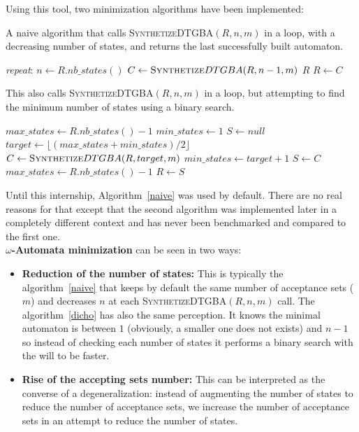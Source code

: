 \noindent Using this tool, two minimization algorithms have been implemented:
\begin{algorithm}[H]
 \caption{A naive algorithm that calls \textsc{Synthetize}DTGBA$(R,n,m)$ in a loop, with a decreasing
          number of states, and returns the last successfully built automaton.}
 \label{naive}
 \begin{algorithmic}[1]
   \BState \emph{repeat}:
   \State $n \gets R.nb\_states() $
   \State $C \gets \textsc{Synthetize}DTGBA(R,n-1,m) $
    \Return $R$\EndIf
   \State $R \gets C$
  \EndProcedure
 \end{algorithmic}
\end{algorithm}

\begin{algorithm}[H]
 \caption{This also calls \textsc{Synthetize}DTGBA$(R,n,m)$ in a loop, but attempting to find the minimum
          number of states using a binary search.}
 \label{dicho}
 \begin{algorithmic}[1]
   \State $max\_states \gets R.nb\_states()-1$
   \State $min\_states \gets 1$
   \State $S \gets null$
    \State $target \gets \lfloor(max\_states + min\_states) / 2\rfloor$
    \State $C \gets \textsc{Synthetize}DTGBA(R,target,m)$
     \State $min\_states \gets target + 1$
    \Else
     \State $S \gets C$
     \State $max\_states \gets R.nb\_states()-1$
    \EndIf
   \EndWhile
   \State $R \gets S$
  \EndProcedure
 \end{algorithmic}
\end{algorithm}

\noindent Until this internship, Algorithm~\ref{naive} was used by default. There are no real reasons for
that except that the second algorithm was implemented later in a completely different context and has never
been benchmarked and compared to the first one.\\

\noindent \textbf{$\omega$-Automata minimization} can be seen in two ways:
\begin{itemize}
 \item \textbf{Reduction of the number of states:}
       This is typically the algorithm~\ref{naive} that keeps by default the same number of acceptance sets
       ($m$) and decreases $n$ at each \textsc{Synthetize}DTGBA$(R,n,m)$ call. The algorithm~\ref{dicho}
       has also the same perception. It knows the minimal automaton is between $1$ (obviously, a smaller
       one does not exists) and $n-1$ so instead of checking each number of states it performs a binary
       search with the will to be faster.
 \item \textbf{Rise of the accepting sets number:}
       This can be interpreted as the converse of a degeneralization: instead of augmenting the number
       of states to reduce the number of acceptance sets, we increase the number of acceptance sets in
       an attempt to reduce the number of states.
\end{itemize}

